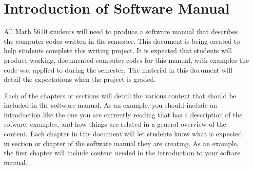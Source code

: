 
\section{\bf Introduction of Software Manual}

All Math 5610 students will need to produce a software manual that describes the
computer codes written in the semester. This document is being created to help
students complete this writing project. It is expected that students will
produce working, documented computer codes for this manual, with examples the
code was applied to during the semester. The material in this document will
detail the expectations when the project is graded.

Each of the chapters or sections will detail the various content that should be
included in the software manual. As an example, you should include an
introduction like the one you are currently reading that has a description of
the sofware, examples, and how things are related in a general overview of the
content. Each chapter in this document will let students know what is expected
in section or chapter of the software manual they are creating. As an example,
the first chapter will include content needed in the introduction to your
softare manual.

\newpage
